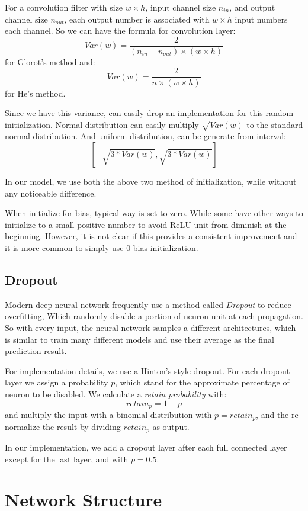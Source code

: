 \documentclass[10pt,twocolumn,letterpaper]{article}
\begin{document}
For a convolution filter with size $w\times h$, input channel size $n_{in}$, and output channel size
$n_{out}$, each output number is associated with $w\times h$ input numbers each channel. So we can have
the formula for convolution layer:
$$
Var(w) = \frac{2}{(n_{in} + n_{out}) \times (w\times h)}
$$
for Glorot's method and:
$$
Var(w) = \frac{2}{n \times (w\times h)}
$$
for He's method.

Since we have this variance, can easily drop an implementation for this random initialization. 
Normal distribution can easily multiply $\sqrt{Var(w)}$ to the standard normal distribution.
And uniform distribution, can be generate from interval:
$$
[-\sqrt{3*Var(w)}, \sqrt{3*Var(w)}]
$$

In our model, we use both the above two method of initialization, while without any noticeable
difference.

When initialize for bias, typical way is set to zero. While some have other ways\cite{krizhevsky2012imagenet}
to initialize to a small positive number to avoid ReLU unit from diminish at the beginning.
However, it is not clear if this provides a consistent improvement and it is more common to
simply use 0 bias initialization\cite{cs231nInit}.

\subsection{Dropout}
Modern deep neural network frequently use a method called \emph{Dropout}
to reduce overfitting\cite{srivastava2014dropout},
Which randomly disable a portion of neuron unit at each propagation. So with every input, the neural
network samples a different architectures\cite{krizhevsky2012imagenet}, which is similar to train many
different models and use their average as the final prediction result.

For implementation details, we use a Hinton's style dropout\cite{hinton2012improving}.
For each dropout layer we assign a probability $p$, which stand for the approximate percentage of
neuron to be disabled. We calculate a \emph{retain probability} with:
$$
retain_p = 1 - p
$$
and multiply the input with a binomial distribution with $p=retain_p$, and the re-normalize the result
by dividing $retain_p$ as output.

In our implementation, we add a dropout layer after each full connected layer except for the last layer,
and with $p=0.5$.

\section{Network Structure}
\end{document}
